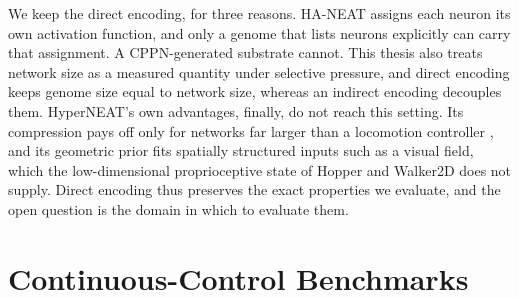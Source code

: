 We keep the direct encoding, for three reasons.
HA-NEAT assigns each neuron its own activation function, and only a genome that lists neurons explicitly can carry that assignment. A CPPN-generated substrate cannot.
This thesis also treats network size as a measured quantity under selective pressure, and direct encoding keeps genome size equal to network size, whereas an indirect encoding decouples them.
HyperNEAT's own advantages, finally, do not reach this setting.
Its compression pays off only for networks far larger than a locomotion controller \parencite{stanley_hypercubebased_2009}, and its geometric prior fits spatially structured inputs such as a visual field, which the low-dimensional proprioceptive state of Hopper and Walker2D does not supply.
Direct encoding thus preserves the exact properties we evaluate, and the open question is the domain in which to evaluate them.

\section{Continuous-Control Benchmarks}
\label{subsec:control-benchmarks}


